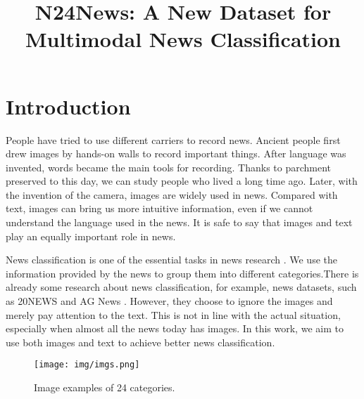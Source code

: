 \documentclass[10pt, a4paper]{article}
\title{N24News: A New Dataset for Multimodal News Classification}
\begin{document}
\maketitleabstract

\def\thefootnote{*}\def\thefootnote{\arabic{footnote}}

\section{Introduction}

People have tried to use different carriers to record news. Ancient people first drew images by hands-on walls to record important things. After language was invented, words became the main tools for recording. Thanks to parchment preserved to this day, we can study people who lived a long time ago. Later, with the invention of the camera, images are widely used in news. Compared with text, images can bring us more intuitive information, even if we cannot understand the language used in the news. It is safe to say that images and text play an equally important role in news. 

News classification is one of the essential tasks in news research \cite{katari2020survey}.
We use the information provided by the news to group them into different categories.There is already some research about news classification, for example,  news datasets, such as 20NEWS  and AG News .
However, they choose to ignore the images and merely pay attention to the text.
This is not in line with the actual situation, especially when almost all the news today has images.
In this work, we aim to use both images and text to achieve better news classification. 




\begin{figure*}[]
    \centering
    \texttt{[image: img/imgs.png]}
    \caption{Image examples of 24 categories.}
    \label{fig:images}
\end{figure*}
\end{document}
